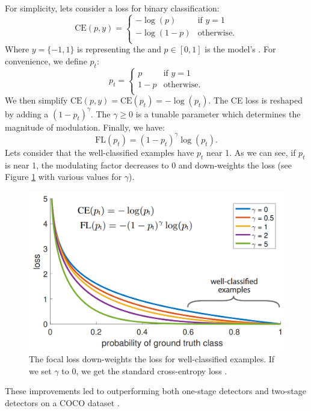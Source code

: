For simplicity, lets consider a  loss for binary classification:
\[ 
\text{CE}(p, y) = \left\{
\begin{array}{ll}
    -\log(p)   & \text{if } y = 1 \\
    -\log(1-p) & \text{otherwise.} \\
\end{array} 
\right. 
\]
Where $y = \{-1, 1\}$ is representing the  and $p \in [0, 1]$ is the model's . For convenience, we define $p_t$:
\[ 
p_t = \left\{
\begin{array}{ll}
    p   & \text{if } y = 1 \\
    1-p & \text{otherwise.} \\
\end{array} 
\right. 
\]
We then simplify $\text{CE}(p,y) = \text{CE}(p_t) = -\log(p_t)$. The CE loss is reshaped by adding a  $(1 - p_t)^\gamma$. The $\gamma \geq 0$ is a tunable parameter which determines the magnitude of modulation. Finally, we have:
$$
    \text{FL}(p_t) = (1-p_t)^\gamma \log(p_t).
$$
Lets consider that the well-classified examples have $p_t$ near 1. As we can see, if $p_t$ is near 1, the modulating factor decreases to 0 and down-weights the loss (see Figure \ref{fig:focalloss} with various values for $\gamma$).

\begin{figure}[h]
    \centering
    \includegraphics[width=0.7\linewidth]{Sources/Figures/focalloss.png}
    \caption{The focal loss down-weights the loss for well-classified examples. If we set $\gamma$ to 0, we get the standard cross-entropy loss \cite{retinanet}.}
    \label{fig:focalloss}
\end{figure}

These improvements led to outperforming both one-stage detectors and two-stage detectors on a COCO dataset \cite{coco}.




